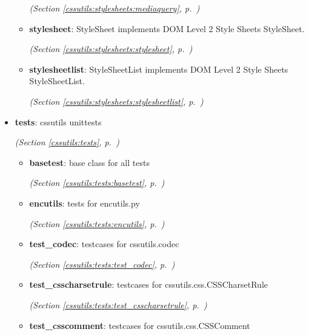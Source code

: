 \begin{itemize}
\begin{itemize}
  \textit{(Section \ref{cssutils:stylesheets:mediaquery}, p.~\pageref{cssutils:stylesheets:mediaquery})}

    \item \textbf{stylesheet}: 
StyleSheet implements DOM Level 2 Style Sheets StyleSheet.


  \textit{(Section \ref{cssutils:stylesheets:stylesheet}, p.~\pageref{cssutils:stylesheets:stylesheet})}

    \item \textbf{stylesheetlist}: 
StyleSheetList implements DOM Level 2 Style Sheets StyleSheetList.


  \textit{(Section \ref{cssutils:stylesheets:stylesheetlist}, p.~\pageref{cssutils:stylesheets:stylesheetlist})}

  \end{itemize}
\item \textbf{tests}: cssutils unittests



  \textit{(Section \ref{cssutils:tests}, p.~\pageref{cssutils:tests})}

  \begin{itemize}
\setlength{\parskip}{0ex}
    \item \textbf{basetest}: base class for all tests



  \textit{(Section \ref{cssutils:tests:basetest}, p.~\pageref{cssutils:tests:basetest})}

    \item \textbf{encutils}: tests for encutils.py



  \textit{(Section \ref{cssutils:tests:encutils}, p.~\pageref{cssutils:tests:encutils})}

    \item \textbf{test\_codec}: testcases for cssutils.codec



  \textit{(Section \ref{cssutils:tests:test_codec}, p.~\pageref{cssutils:tests:test_codec})}

    \item \textbf{test\_csscharsetrule}: testcases for cssutils.css.CSSCharsetRule



  \textit{(Section \ref{cssutils:tests:test_csscharsetrule}, p.~\pageref{cssutils:tests:test_csscharsetrule})}

    \item \textbf{test\_csscomment}: testcases for cssutils.css.CSSComment




\end{itemize}
\end{itemize}
